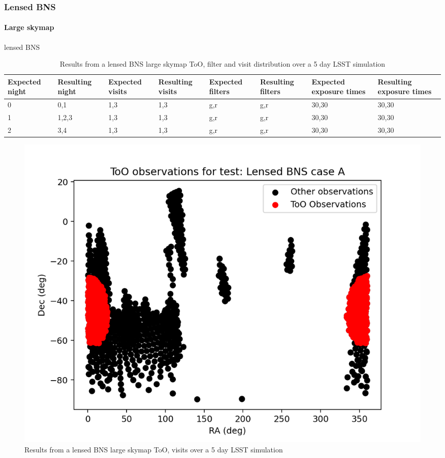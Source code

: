\subsubsection{Lensed BNS}

\paragraph{Large skymap} lensed BNS

\begin{table}[h!]
\centering
\begin{adjustbox}{max width=\linewidth}
\begin{tabular}{|l|l|l|l|l|l|l|l|}
\hline
Expected night & Resulting night & Expected visits & Resulting visits & Expected filters & Resulting filters & Expected exposure times & Resulting exposure times \\ \hline
0              & 0,1             & 1,3             & 1,3              & g,r              & g,r               & 30,30                   & 30,30                    \\ \hline
1              & 1,2,3           & 1,3             & 1,3              & g,r              & g,r               & 30,30                   & 30,30                    \\ \hline
2              & 3,4             & 1,3             & 1,3              & g,r              & g,r               & 30,30                   & 30,30                    \\ \hline
\end{tabular}
\end{adjustbox}
\caption{Results from a lensed BNS large skymap ToO, filter and visit distribution over a 5 day LSST simulation}
\label{tab:LensedBNSAResults}
\end{table}


\begin{figure}[h!]
    \centering
    \includegraphics[width=0.85\linewidth]{figures/validationTests/SVRequired/LensedBNSAPosition.png}
    \caption{Results from a lensed BNS large skymap ToO, visits over a 5 day LSST simulation}
    \label{fig:LensedBNSAPositionResult}
\end{figure}

